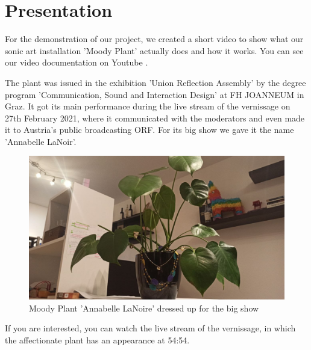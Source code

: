 \section{Presentation}

For the demonstration of our project, we created a short video to show what our sonic art installation 'Moody Plant' actually does and how it works. You can see our video documentation on Youtube \cite{youtubeDemo}.

The plant was issued in the exhibition 'Union Reflection Assembly' by the degree program 'Communication, Sound and Interaction Design' at FH JOANNEUM in Graz. It got its main performance during the live stream of the vernissage on 27th February 2021, where it communicated with the moderators and even made it to Austria's public broadcasting ORF. For its big show we gave it the name 'Annabelle LaNoir'.


\begin{figure}[H]
\begin{center}
\includegraphics[width=0.8\linewidth]{Figures/plant2.jpg}
\caption{Moody Plant 'Annabelle LaNoire' dressed up for the big show}
\end{center}
\end{figure}



If you are interested, you can watch the live stream \cite{liveStream} of the vernissage, in which the affectionate plant has an appearance at 54:54. 

